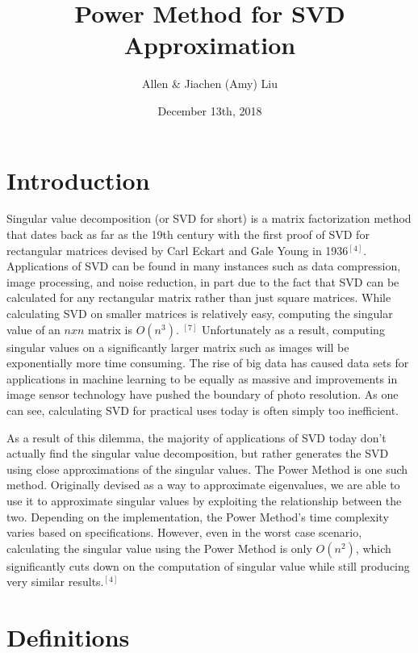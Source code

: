 \documentclass[12pt]{article}
\title{Power Method for SVD Approximation}
\author{Allen \& Jiachen (Amy) Liu}
\date{December 13th, 2018}
\begin{document}
 
\maketitle
 
\section{Introduction}
\vspace{-8pt}
\hspace{+24pt}Singular value decomposition (or SVD for short) is a matrix factorization method that dates back as far as the 19th century with the first proof of SVD for rectangular matrices devised by Carl Eckart and Gale Young in 1936$^{[4]}$. Applications of SVD can be found in many instances such as data compression, image processing, and noise reduction, in part due to the fact that SVD can be calculated for any rectangular matrix rather than just square matrices. While calculating SVD on smaller matrices is relatively easy, computing the singular value of an $n x n$ matrix is $O(n^3)$. $^{[7]}$ Unfortunately as a result, computing singular values on a significantly larger matrix such as images will be exponentially more time consuming. The rise of big data has caused data sets for applications in machine learning to be equally as massive and improvements in image sensor technology have pushed the boundary of photo resolution. As one can see, calculating SVD for practical uses today is often simply too inefficient.

\hspace{+24pt}As a result of this dilemma, the majority of applications of SVD today don't actually find the singular value decomposition, but rather generates the SVD using close approximations of the singular values. The Power Method is one such method. Originally devised as a way to approximate eigenvalues, we are able to use it to approximate singular values by exploiting the relationship between the two. Depending on the implementation, the Power Method's time complexity varies based on specifications. However, even in the worst case scenario, calculating the singular value using the Power Method is only $O(n^2)$,  which significantly cuts down on the computation of singular value while still producing very similar results.$^{[4]}$
 
\section{Definitions}
\vspace{-8pt}
\end{document}

